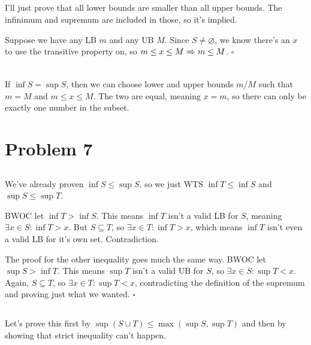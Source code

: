 \documentclass[12pt]{article}
\newcommand{\ra}{\xRightarrow}
\begin{document}
\subsection{}

I'll just prove that all lower bounds are smaller than all upper bounds.
The infinimum and supremum are included in those, so it's implied.

Suppose we have any LB $m$ and any UB $M$.
Since $S \ne \varnothing$, we know there's an $x$ to use the transitive property on,
so $m \le x \le M \ra\ m \le M$. $\square$

\subsection{}

If $\inf S = \sup S$, then we can choose lower and upper bounds $m$/$M$
such that $m=M$ and $m \le x \le M$.
The two are equal, meaning $x=m$, so there can only be exactly one number
in the subset.

\pagebreak

\section{Problem 7}

\subsection{}

We've already proven $\inf S \le \sup S$, so we just WTS $\inf T \le \inf S$ and $\sup S \le \sup T$.

BWOC let $\inf T > \inf S$.
This means $\inf T$ isn't a valid LB for $S$, meaning $\exists x \in S: \inf T > x$.
But $S \subseteq T$, so $\exists x \in T: \inf T > x$,
which means $\inf T$ isn't even a valid LB for it's own set.
Contradiction.

The proof for the other inequality goes much the same way.
BWOC let $\sup S > \inf T$.
This means $\sup T$ isn't a valid UB for $S$, so $\exists x \in S: \sup T < x$.
Again, $S \subseteq T$, so $\exists x \in T: \sup T < x$,
contradicting the definition of the supremum and proving just what we wanted. $\square$

\subsection{}

Let's prove this first by $\sup(S \cup T) \le \max(\sup S, \sup T)$ and then
by showing that strict inequality can't happen.
\end{document}

